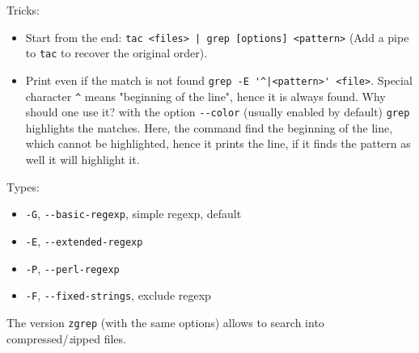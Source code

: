 \documentclass[a4paper,12pt,%
              final%
              ]{article}
\begin{document}
Tricks:
\begin{itemize}
  \item Start from the end: \verb!tac <files> | grep [options] <pattern>! (Add a pipe to \texttt{tac} to recover the original order).
  \item Print even if the match is not found \verb!grep -E '^|<pattern>' <file>!. Special character \verb|^| means "beginning of the line", hence it is always found. Why should one use it? with the option \verb|--color| (usually enabled by default) \verb|grep| highlights the matches. Here, the command find the beginning of the line, which cannot be highlighted, hence it prints the line, if it finds the pattern as well it will highlight it.
\end{itemize}

Types:
\begin{itemize}
  \item \texttt{-G}, \verb|--basic-regexp|, simple regexp, default
  \item \texttt{-E}, \verb|--extended-regexp|
  \item \texttt{-P}, \verb|--perl-regexp|
  \item \texttt{-F}, \verb|--fixed-strings|, exclude regexp
\end{itemize}

The version \texttt{zgrep} (with the same options) allows to search into compressed/\emph{z}ipped files.

\end{document}
